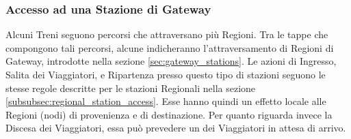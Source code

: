 
	\subsubsection{Accesso ad una Stazione di Gateway}\label{subsubsec:gateway_stations_func}
	
	Alcuni Treni seguono percorsi che attraversano più Regioni. Tra le tappe che compongono tali percorsi, alcune indicheranno l'attraversamento di Regioni di Gateway, introdotte nella sezione \ref{sec:gateway_stations}. 
	Le azioni di Ingresso, Salita dei Viaggiatori, e Ripartenza presso questo tipo di stazioni seguono le stesse regole descritte per le stazioni Regionali nella sezione \ref{subsubsec:regional_station_access}. Esse hanno quindi un effetto locale alle Regioni (nodi) di provenienza e di destinazione.
	Per quanto riguarda invece la Discesa dei Viaggiatori, essa può prevedere un  dei Viaggiatori in attesa di arrivo.
	
